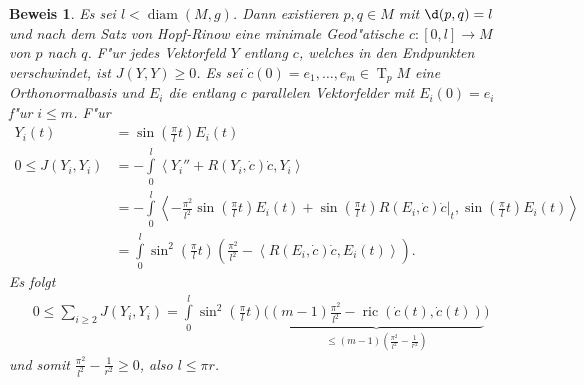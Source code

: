 \documentclass[paper=A4, twoside, chapterprefix=true, bibliography=totoc, headsepline]{scrbook}
\DeclareMathOperator{\diam}{diam}   %
\DeclareMathOperator{\ric}{ric}     %
\DeclareMathOperator{\T}{T}         %
\theoremstyle{plain}
\theoremstyle{nonumberplain}
\newtheorem{bew}{Beweis}
\theoremstyle{empty}
\theoremstyle{break}
\begin{document}
\begin{bew}
  Es sei $l < \diam(M,g)$.
  Dann existieren $p,q \in M$ mit $\d(p,q) = l$ und nach dem Satz von Hopf-Rinow eine minimale Geod"atische $c\colon[0,l] \to M$ von $p$ nach $q$.
  F"ur jedes Vektorfeld $Y$ entlang $c$, welches in den Endpunkten verschwindet, ist $J(Y,Y) \geq 0$.
  Es sei $\dot c(0) = e_1, \ldots, e_m \in \T_pM$ eine Orthonormalbasis und $E_i$ die entlang $c$ parallelen Vektorfelder mit $E_i(0) = e_i$ f"ur $i \leq m$.
  F"ur 
  \begin{align*}
    Y_i(t) & = \sin \left(\frac{\pi}{l}t \right) E_i(t)\\
    0  \leq J(Y_i,Y_i) &= -\int\limits_0^l\left<Y_i''+R(Y_i,\dot c)\dot c,Y_i\right>\\
    & = -\int\limits_0^l\left<-\frac{\pi^2}{l^2}\sin\left(\frac{\pi}{l}t\right)E_i(t) + \sin\left(\frac{\pi}{l}t\right)R(E_i,\dot c)\dot c|_t,\sin\left(\frac{\pi}{l}t\right)E_i(t)\right>\\
    & = \int\limits_0^l \sin^2\left(\frac{\pi}{l}t\right)\left(\frac{\pi^2}{l^2}-\left<R(E_i,\dot c)\dot c,E_i(t)\right>\right).
  \end{align*}
  Es folgt
  \begin{align*}
    0 \leq \sum_{i \geq 2}J(Y_i,Y_i) = \int\limits_0^l\sin^2\left(\frac{\pi}{l}t\right)\Big(\underbrace{(m-1)\frac{\pi^2}{l^2} - \ric(\dot c(t),\dot c(t))}_{\leq (m-1)\left(\frac{\pi^2}{l^2}-\frac{1}{r^2}\right)}\Big)
  \end{align*}
  und somit $\frac{\pi^2}{l^2} - \frac{1}{r^2} \geq 0$, also $l \leq \pi r$.
\end{bew}
\end{document}
